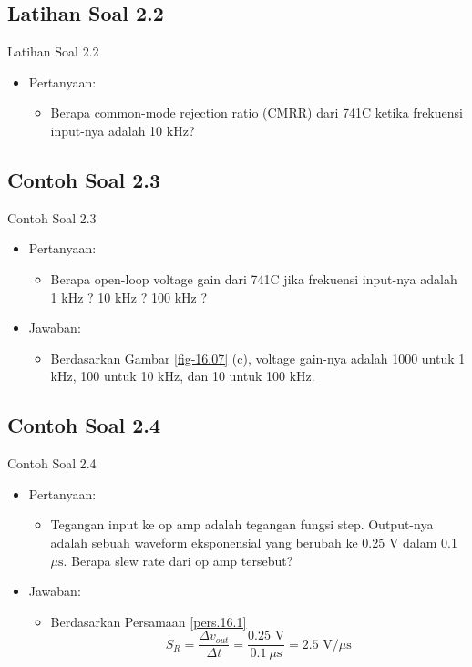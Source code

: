 \subsection{Latihan Soal 2.2}
\begin{frame}{Latihan Soal 2.2}
	\begin{itemize}
		\item Pertanyaan:
		\begin{itemize}
			\item Berapa common-mode rejection ratio (CMRR) dari 741C ketika frekuensi input-nya adalah 10 kHz?
		\end{itemize}
	\end{itemize}
\end{frame}

\subsection{Contoh Soal 2.3}
\begin{frame}{Contoh Soal 2.3}
	\begin{itemize}
		\item Pertanyaan:
		\begin{itemize}
			\item Berapa open-loop voltage gain dari 741C jika frekuensi input-nya adalah 1 kHz ? 10 kHz ? 100 kHz ?
		\end{itemize}
		\item Jawaban:
		\begin{itemize}
			\item Berdasarkan Gambar \ref{fig-16.07} (c), voltage gain-nya adalah 1000 untuk 1 kHz, 100 untuk 10 kHz, dan 10 untuk 100 kHz.
		\end{itemize}
	\end{itemize}
\end{frame}

\subsection{Contoh Soal 2.4}
\begin{frame}{Contoh Soal 2.4}
	\begin{itemize}
		\item Pertanyaan:
		\begin{itemize}
			\item Tegangan input ke op amp adalah tegangan fungsi step. Output-nya adalah sebuah waveform eksponensial yang berubah ke 0.25 V dalam 0.1 $ \mu \text{s} $. Berapa slew rate dari op amp tersebut?
		\end{itemize}
		\item Jawaban:
		\begin{itemize}
			\item Berdasarkan Persamaan \ref{pers.16.1}
			\[ S_R = \frac{\Delta v_{out}}{\Delta t} = \frac{0.25 \text{ V}}{0.1 ~\mu \text{s}} = 2.5 \text{ V/}\mu \text{s}\]
		\end{itemize}
	\end{itemize}
\end{frame}

